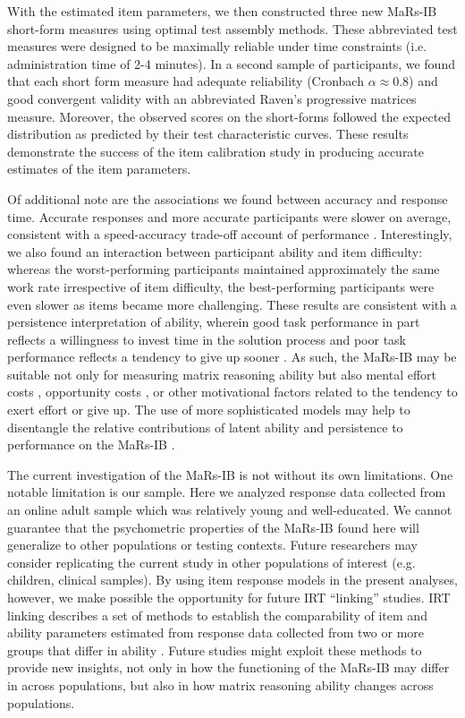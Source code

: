 \documentclass[a4paper,man,natbib]{apa6}
\begin{document}
With the estimated item parameters, we then constructed three new MaRs-IB short-form measures using optimal test assembly methods. These abbreviated test measures were designed to be maximally reliable under time constraints (i.e. administration time of 2-4 minutes). In a second sample of participants, we found that each short form measure had adequate reliability (Cronbach $\alpha \approx 0.8$) and good convergent validity with an abbreviated Raven's progressive matrices measure. Moreover, the observed scores on the short-forms followed the expected distribution as predicted by their test characteristic curves. These results demonstrate the success of the item calibration study in producing accurate estimates of the item parameters. 

Of additional note are the associations we found between accuracy and response time. Accurate responses and more accurate participants were slower on average, consistent with a speed-accuracy trade-off account of performance \citep{heitz2014speed}. Interestingly, we also found an interaction between participant ability and item difficulty: whereas the worst-performing participants maintained approximately the same work rate irrespective of item difficulty, the best-performing participants were even slower as items became more challenging. These results are consistent with a persistence interpretation of ability, wherein good task performance in part reflects a willingness to invest time in the solution process and poor task performance reflects a tendency to give up sooner \citep{ranger2021effects}. As such, the MaRs-IB may be suitable not only for measuring matrix reasoning ability but also mental effort costs \citep{kool2018mental}, opportunity costs \citep{payne1996time}, or other motivational factors \citep{duckworth2011role} related to the tendency to exert effort or give up. The use of more sophisticated models may help to disentangle the relative contributions of latent ability and persistence to performance on the MaRs-IB \citep{ranger2014accumulator}.

The current investigation of the MaRs-IB is not without its own limitations. One notable limitation is our sample. Here we analyzed response data collected from an online adult sample which was relatively young and well-educated. We cannot guarantee that the psychometric properties of the MaRs-IB found here will generalize to other populations or testing contexts. Future researchers may consider replicating the current study in other populations of interest (e.g. children, clinical samples). By using item response models in the present analyses, however, we make possible the opportunity for future IRT ``linking'' studies. IRT linking describes a set of methods to establish the comparability of item and ability parameters estimated from response data collected from two or more groups that differ in ability \citep{lee2018irt}. Future studies might exploit these methods to provide new insights, not only in how the functioning of the MaRs-IB may differ in across populations, but also in how matrix reasoning ability changes across populations.
\end{document}
